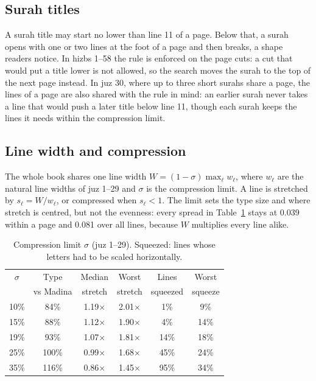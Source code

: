 \documentclass[sigconf,nonacm]{acmart}
\newcommand{\x}{\ensuremath{\times}}
\begin{document}
\subsection{Surah titles}\label{sec:titles}
A surah title may start no lower than line 11 of a page. Below that, a surah opens with one or two lines at the foot of a page and then breaks, a shape readers notice. In hizbs 1--58 the rule is enforced on the page cuts: a cut that would put a title lower is not allowed, so the search moves the surah to the top of the next page instead. In juz 30, where up to three short surahs share a page, the lines of a page are also shared with the rule in mind: an earlier surah never takes a line that would push a later title below line 11, though each surah keeps the lines it needs within the compression limit.

\subsection{Line width and compression}\label{sec:compress}
The whole book shares one line width $W=(1-\sigma)\max_\ell w_\ell$, where $w_\ell$ are the natural line widths of juz 1--29 and $\sigma$ is the compression limit. A line is stretched by $s_\ell=W/w_\ell$, or compressed when $s_\ell<1$. The limit sets the type size and where stretch is centred, but not the evenness: every spread in Table~\ref{tab:shrink} stays at 0.039 within a page and 0.081 over all lines, because $W$ multiplies every line alike.

\begin{table}[t]
  \centering\small
  \caption{Compression limit $\sigma$ (juz 1--29). Squeezed: lines whose letters had to be scaled horizontally.}
  \label{tab:shrink}
  \begin{tabular}{@{}cccccc@{}}
    \toprule
    $\sigma$ & Type & Median & Worst & Lines & Worst \\
    & vs Madina & stretch & stretch & squeezed & squeeze \\
    \midrule
    10\% & 84\% & 1.19\x & 2.01\x & 1\% & 9\% \\
    15\% & 88\% & 1.12\x & 1.90\x & 4\% & 14\% \\
    \rowcolor{nazm!10} 19\% & 93\% & 1.07\x & 1.81\x & 14\% & 18\% \\
    25\% & 100\% & 0.99\x & 1.68\x & 45\% & 24\% \\
    35\% & 116\% & 0.86\x & 1.45\x & 95\% & 34\% \\
    \bottomrule
  \end{tabular}
\end{table}
\end{document}
